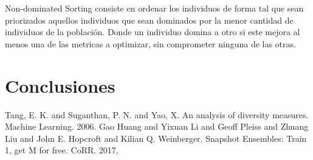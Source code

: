 \documentclass[runningheads,a4paper]{llncs}
\begin{document}
	Non-dominated Sorting consiste en ordenar los individuos de forma tal que sean priorizados aquellos
	individuos que sean dominados por la menor cantidad de individuos de la población. Donde un individuo
	domina a otro si este mejora al menos una de las metricas a optimizar, sin comprometer ninguna de las
	otras.
	
	\section*{Conclusiones}
	
	
	\begin{thebibliography}{4}
		
		 Tang, E. K. and Suganthan, P. N. and Yao, X. An analysis of diversity measures. Machine Learning. 2006.
		 Gao Huang and Yixuan Li and Geoff Pleiss and Zhuang Liu and John E. Hopcroft and Kilian Q. Weinberger. Snapshot Ensembles: Train 1, get {M} for free. CoRR. 2017,
		
	\end{thebibliography}
	
	
\end{document}
